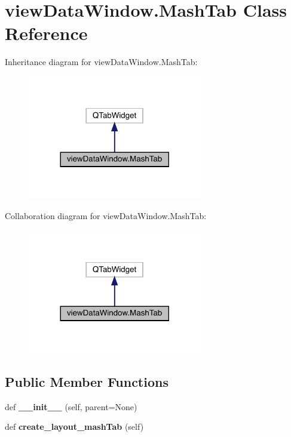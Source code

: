 \hypertarget{classview_data_window_1_1_mash_tab}{}\section{view\+Data\+Window.\+Mash\+Tab Class Reference}
\label{classview_data_window_1_1_mash_tab}


Inheritance diagram for view\+Data\+Window.\+Mash\+Tab\+:\nopagebreak
\begin{figure}[H]
\begin{center}
\leavevmode
\includegraphics[width=216pt]{classview_data_window_1_1_mash_tab__inherit__graph}
\end{center}
\end{figure}


Collaboration diagram for view\+Data\+Window.\+Mash\+Tab\+:\nopagebreak
\begin{figure}[H]
\begin{center}
\leavevmode
\includegraphics[width=216pt]{classview_data_window_1_1_mash_tab__coll__graph}
\end{center}
\end{figure}
\subsection*{Public Member Functions}
\begin{DoxyCompactItemize}
\item 
\mbox{\label{classview_data_window_1_1_mash_tab_a97b52985f24884869c150b4cb4be3b19}} 
def {\bfseries \+\_\+\+\_\+init\+\_\+\+\_\+} (self, parent=None)
\item 
\mbox{\label{classview_data_window_1_1_mash_tab_a573490e69756577756edb6a700565d7a}} 
def {\bfseries create\+\_\+layout\+\_\+mash\+Tab} (self)
\end{DoxyCompactItemize}
